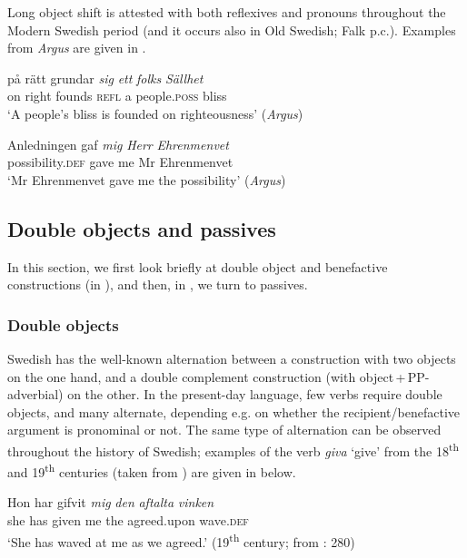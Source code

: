 \documentclass[output=paper]{langscibook}
\begin{document}
\z
\z


Long object shift is attested with both reflexives and pronouns throughout the Modern Swedish period (and it occurs also in Old Swedish; Falk p.c.). Examples from \textit{Argus} are given in .


\ea \label{ex:intro:21}
\ea
\gll  på rätt   grundar \textit{sig} \textit{ett} \textit{folks} \textit{Sällhet} \\
    on right founds    \textsc{refl}   a   people\textsc{.poss}   bliss\\
    \glt `A people’s bliss is founded on righteousness’ (\textit{Argus})

\ex
\gll  Anledningen     gaf \textit{mig} \textit{Herr} \textit{Ehrenmenvet}  \\
       possibility.\textsc{def}  gave   me   Mr  Ehrenmenvet\\
    \glt `Mr Ehrenmenvet gave me the possibility’ (\textit{Argus})
\z
\z

\subsection{Double objects and passives}\label{sec:intro:3.3}


In this section, we first look briefly at double object and benefactive constructions (in ), and then, in , we turn to passives.


\subsubsection{Double objects}\label{sec:intro:3.3.1}


Swedish has the well-known alternation between a construction with two objects on the one hand, and a double complement construction (with object\,+\,PP-adverbial) on the other. In the present-day language, few verbs require double objects, and many alternate, depending e.g. on whether the recipient/benefactive argument is pronominal or not. The same type of alternation can be observed throughout the history of Swedish; examples of the verb \textit{giva} ‘give’ from the 18\textsuperscript{th} and 19\textsuperscript{th} centuries (taken from \citealt{Valdeson2016}) are given in  below.


\ea \label{ex:intro:22}
\ea \label{ex:intro:22a}
\gll  Hon har gifvit \textit{mig} \textit{den} \textit{aftalta} \textit{vinken} \\      
     she   has given   me   the   agreed.upon  wave.\textsc{def}\\
     \glt ‘She has waved at me as we agreed.’ (19\textsuperscript{th} century; from \citealt{Valdeson2016}: 280) 
\end{document}
